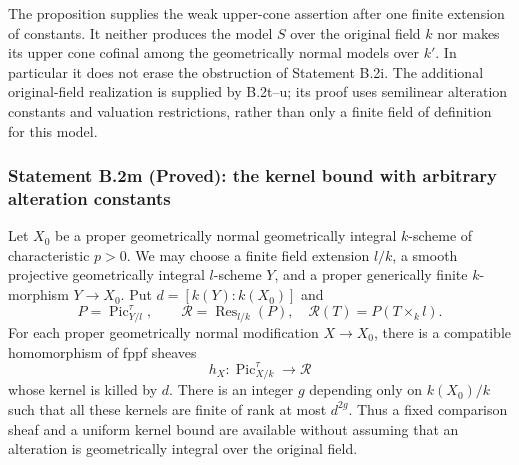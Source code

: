 \begin{remark}
The proposition supplies the weak upper-cone assertion after one
finite extension of constants.  It neither produces the model $S$
over the original field $k$ nor makes its upper cone cofinal among
the geometrically normal models over $k'$.  In particular it does
not erase the obstruction of Statement B.2i.  The additional
original-field realization is supplied by B.2t--u; its proof
uses semilinear alteration constants and valuation restrictions,
rather than only a finite field of definition for this model.
\end{remark}


\subsubsection*{Statement B.2m (Proved): the kernel bound with arbitrary alteration constants}
\begin{proposition}
\label{B:B2-alteration-constants}
Let $X_0$ be a proper geometrically normal geometrically integral
$k$-scheme of characteristic $p>0$.  We may choose a finite field
extension $l/k$, a smooth projective geometrically integral
$l$-scheme $Y$, and a proper generically finite $k$-morphism
$Y\to X_0$.  Put $d=[k(Y):k(X_0)]$ and
\[
 P=\operatorname{Pic}^{\tau}_{Y/l},\qquad
 \mathcal R=\operatorname{Res}_{l/k}(P),
 \quad\mathcal R(T)=P(T\times_k l).
\]
For each proper geometrically normal modification $X\to X_0$,
there is a compatible homomorphism of fppf sheaves
\[
 h_X:\operatorname{Pic}^{\tau}_{X/k}\longrightarrow\mathcal R
\]
whose kernel is killed by $d$.  There is an integer $g$ depending
only on $k(X_0)/k$ such that all these kernels are finite of rank
at most $d^{2g}$.  Thus a fixed comparison sheaf and a uniform
kernel bound are available without assuming that an alteration
is geometrically integral over the original field.
\end{proposition}
